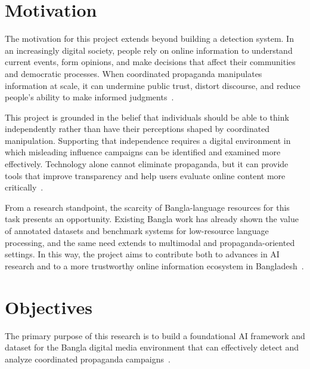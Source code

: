 \section{Motivation}
The motivation for this project extends beyond building a detection system. In an
increasingly digital society, people rely on online information to understand
current events, form opinions, and make decisions that affect their communities and
democratic processes. When coordinated propaganda manipulates information at scale,
it can undermine public trust, distort discourse, and reduce people's ability to
make informed judgments~\cite{hristakieva2022}.

This project is grounded in the belief that individuals should be able to think
independently rather than have their perceptions shaped by coordinated
manipulation. Supporting that independence requires a digital environment in which
misleading influence campaigns can be identified and examined more effectively.
Technology alone cannot eliminate propaganda, but it can provide tools that improve
transparency and help users evaluate online content more critically~\cite{ng2023}.

From a research standpoint, the scarcity of Bangla-language resources for this task
presents an opportunity. Existing Bangla work has already shown the value of
annotated datasets and benchmark systems for low-resource language processing, and
the same need extends to multimodal and propaganda-oriented settings. In this way,
the project aims to contribute both to advances in AI research and to a more
trustworthy online information ecosystem in Bangladesh~\cite{hossain2020}.

\section{Objectives}
The primary purpose of this research is to build a foundational AI framework and
dataset for the Bangla digital media environment that can effectively detect and
analyze coordinated propaganda campaigns~\cite{ng2023}.

